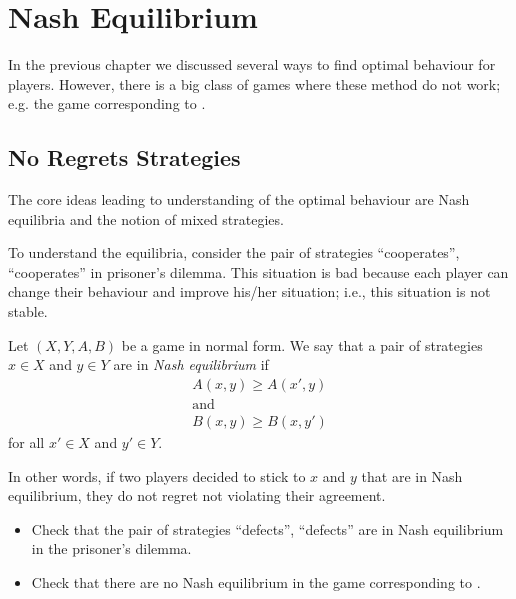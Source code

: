 \chapter{Nash Equilibrium}
In the previous chapter we discussed several ways to find optimal behaviour for
players. However, there is a big class of games where these method do not work;
e.g. the game corresponding to .


\section{No Regrets Strategies}
The core ideas leading to understanding of the optimal behaviour are Nash
equilibria and the notion of mixed strategies.

To understand the equilibria, consider the pair of strategies ``cooperates'',
``cooperates'' in prisoner's dilemma. This situation is bad because each player
can change their behaviour and improve his/her situation; i.e., this situation
is not stable.
\begin{definition}
  Let $(X, Y, A, B)$ be a game in normal form. We say that a pair of strategies
  $x \in X$ and $y \in Y$ are in \emph{Nash equilibrium} if 
  \begin{gather*}
    A(x, y) \ge A(x', y) \\
    \text{and} \\
    B(x, y) \ge B(x, y')
  \end{gather*}
  for all $x' \in X$ and $y' \in Y$.
\end{definition}
In other words, if two players decided to stick to $x$ and $y$ that are in Nash
equilibrium, they do not regret not violating their agreement.
\begin{exercise}
  \begin{itemize}
    \item Check that the pair of strategies ``defects'', ``defects'' are in Nash
      equilibrium in the prisoner's dilemma.
    \item Check that there are no Nash equilibrium in the game corresponding to
      .
  \end{itemize}
\end{exercise}

